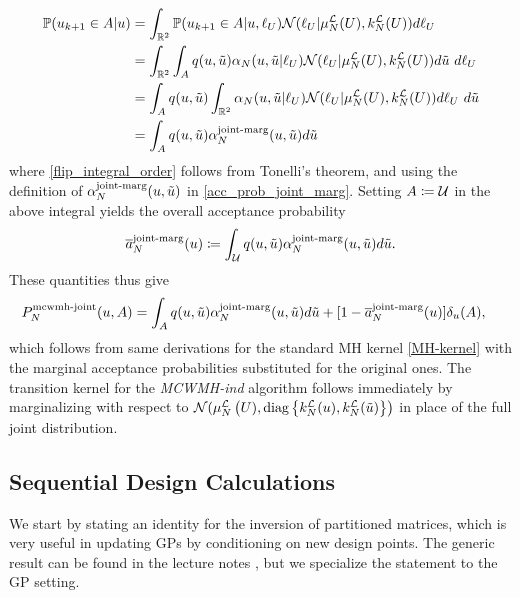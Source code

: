 \documentclass[12pt]{article}
\begin{document}
\begin{align}
\Prob(\indexMCMC[\mcmcIndex+1]{\Par} \in A | \Par)
&= \int_{\R^2} \Prob(\indexMCMC[\mcmcIndex+1]{\Par} \in A | \Par, \llikSamp_{\parMat}) \Gaussian(\llikSamp_{\parMat} | \emMean[\Ndesign]{\llik}(\parMat), \emKer[\Ndesign]{\llik}(\parMat)) d\llikSamp_{\parMat} \\
&= \int_{\R^2} \int_{A} \propDens(\Par, \propPar) \Em[\Ndesign]{\accProbMH}(\Par, \propPar | \llikSamp_{\parMat})  
\Gaussian(\llikSamp_{\parMat} | \emMean[\Ndesign]{\llik}(\parMat), \emKer[\Ndesign]{\llik}(\parMat)) d\propPar \ d\llikSamp_{\parMat} \\
&= \int_{A} \propDens(\Par, \propPar) \int_{\R^2}  \Em[\Ndesign]{\accProbMH}(\Par, \propPar | \llikSamp_{\parMat})  
\Gaussian(\llikSamp_{\parMat} | \emMean[\Ndesign]{\llik}(\parMat), \emKer[\Ndesign]{\llik}(\parMat)) d\llikSamp_{\parMat} \ d\propPar \label{flip_integral_order} \\
&= \int_{A} \propDens(\Par, \propPar) \llikEmJointMarg[\Ndesign]{\accProbMH}(\Par, \propPar)  d\propPar
\end{align}
where \ref{flip_integral_order} follows from Tonelli's theorem, and using the definition of $\llikEmJointMarg[\Ndesign]{\accProbMH}(\Par, \propPar)$
in \ref{acc_prob_joint_marg}. Setting $A \Def \parSpace$ in the above integral yields the overall acceptance probability 
\begin{align}
\llikEmJointMarg[\Ndesign]{\avgAccProbMH}(\Par) \Def \int_{\parSpace} \propDens(\Par, \propPar) \llikEmJointMarg[\Ndesign]{\accProbMH}(\Par, \propPar)  d\propPar. 
\end{align}
These quantities thus give 
\begin{align}
\llikEmJointMCWMH[\Ndesign]{\MarkovKernel}(\Par, A)
&= \int_{A} \propDens(\Par, \propPar) \llikEmJointMarg[\Ndesign]{\accProbMH}(\Par, \propPar) d\propPar
+ [1 - \llikEmJointMarg[\Ndesign]{\avgAccProbMH}(\Par)] \delta_{\Par}(A) \label{MH-kernel}, 
\end{align}
which follows from same derivations for the standard MH kernel \ref{MH-kernel} with the marginal acceptance probabilities substituted for
the original ones. The transition kernel for the \textit{MCWMH-ind} algorithm follows immediately by marginalizing with respect 
to $\Gaussian(\emMean[\Ndesign]{\llik}\left(\parMat), \diag\left\{\emKer[\Ndesign]{\llik}(\Par), \emKer[\Ndesign]{\llik}(\propPar) \right\}\right)$
in place of the full joint distribution. 

\subsection{Sequential Design Calculations}
We start by stating an identity for the inversion of partitioned matrices, which is very useful in updating GPs by 
conditioning on new design points. The generic result can be found in the lecture notes \cite{MinkaMatrixLectures}, 
but we specialize the statement to the GP setting.  
\end{document}

